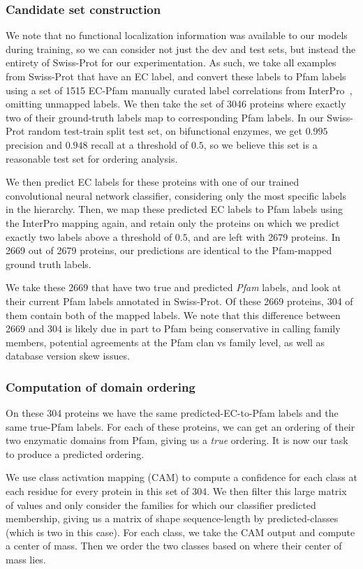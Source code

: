 \subsubsection*{Candidate set construction}
We note that no functional localization information was available to our models during training, so we can consider not just the dev and test sets, but instead the entirety of Swiss-Prot for our experimentation. As such, we take all examples from Swiss-Prot that have an EC label, and convert these labels to Pfam labels using a set of 1515 EC-Pfam manually curated label correlations from InterPro~\cite{mitchell2015interpro}, omitting unmapped labels. We then take the set of 3046 proteins where exactly two of their ground-truth labels map to corresponding Pfam labels. In our Swiss-Prot random test-train split test set, on bifunctional enzymes, we get $0.995$ precision and $0.948$ recall at a threshold of $0.5$, so we believe this set is a reasonable test set for ordering analysis.

We then predict EC labels for these proteins with one of our trained convolutional neural network classifier, considering only the most specific labels in the hierarchy. Then, we map these predicted EC labels to Pfam labels using the InterPro mapping again, and retain only the proteins on which we predict exactly two labels above a threshold of $0.5$, and are left with 2679 proteins. In 2669 out of 2679 proteins, our predictions are identical to the Pfam-mapped ground truth labels. 

We take these 2669 that have two true and predicted \textit{Pfam} labels, and look at their current Pfam labels annotated in Swiss-Prot. Of these 2669 proteins, 304 of them contain both of the mapped labels. We note that this difference between 2669 and 304 is likely due in part to Pfam being conservative in calling family members, potential agreements at the Pfam clan vs family level, as well as database version skew issues.

\subsubsection*{Computation of domain ordering}
On these 304 proteins we have the same predicted-EC-to-Pfam labels and the same true-Pfam labels. For each of these proteins, we can get an ordering of their two enzymatic domains from Pfam, giving us a \textit{true} ordering. It is now our task to produce a predicted ordering.

We use class activation mapping (CAM) to compute a confidence for each class at each residue for every protein in this set of 304. We then filter this large matrix of values and only consider the families for which our classifier predicted membership, giving us a matrix of shape sequence-length by predicted-classes (which is two in this case). For each class, we take the CAM output and compute a center of mass. Then we order the two classes based on where their center of mass lies.


